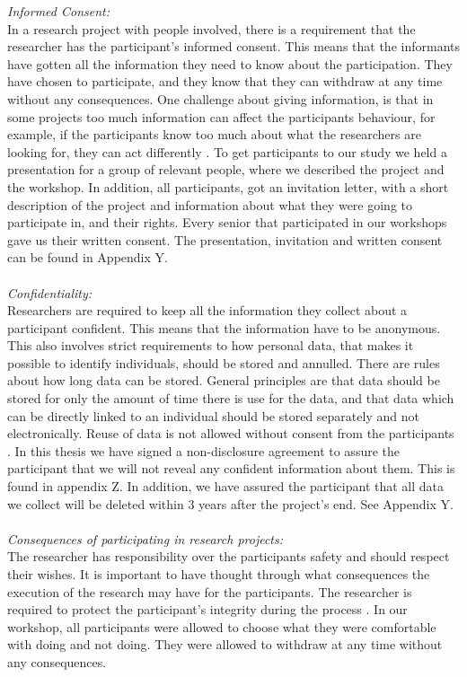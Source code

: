 \emph{Informed Consent:} \\
In a research project with people involved, there is a requirement that the researcher has the participant's informed consent. This means that the informants have gotten all the information they need to know about the participation. They have chosen to participate, and they know that they can withdraw at any time without any consequences. One challenge about giving information, is that in some projects too much information can affect the participants behaviour, for example, if the participants know too much about what the researchers are looking for, they can act differently \cite{qualitative}. To get participants to our study we held a presentation for a group of relevant people, where we described the project and the workshop. In addition, all participants, got an invitation letter, with a short description of the project and information about what they were going to participate in, and their rights. Every senior that participated in our workshops gave us their written consent. The presentation, invitation and written consent can be found in Appendix Y.   \\ \\
\emph{Confidentiality:}\\
Researchers are required to keep all the information they collect about a participant confident. This means that the information have to be anonymous. This also involves strict requirements to how personal data, that makes it possible to identify individuals, should be stored and annulled. There are rules about how long data can be stored. General principles are that data should be stored for only the amount of time there is use for the data, and that data which can be directly linked to an individual should be stored separately and not electronically.  Reuse of data is not allowed without consent from the participants \cite{qualitative}. In this thesis we have signed a non-disclosure agreement to assure the participant that we will not reveal any confident information about them. This is found in appendix Z. In addition, we have assured the participant that all data we collect will be deleted within 3 years after the project's end. See Appendix Y. \\ \\
\emph{Consequences of participating in research projects:}\\
The researcher has responsibility over the participants safety and should respect their wishes. It is important to have thought through what consequences the execution of the research may have for the participants. The researcher is required to protect the participant's integrity during the process \cite{qualitative}. In our workshop, all participants were allowed to choose what they were comfortable with doing and not doing. They were allowed to withdraw at any time without any consequences.  \\ \\

